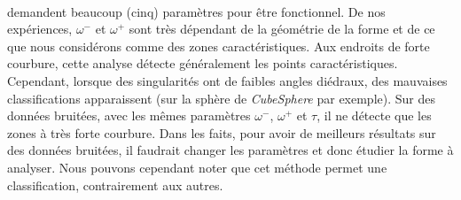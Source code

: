 \paragraph{}
%
 demandent beaucoup (cinq) paramètres pour être fonctionnel. De
nos expériences, $\omega^-$ et $\omega^+$ sont très dépendant de la géométrie de
la forme et de ce que nous considérons comme des zones caractéristiques. Aux
endroits de forte courbure, cette analyse détecte généralement les points
caractéristiques. Cependant, lorsque des singularités ont de faibles angles
diédraux, des mauvaises classifications apparaissent (sur la sphère de
\emph{CubeSphere} par exemple). Sur des données bruitées, avec les mêmes
paramètres $\omega^-$, $\omega^+$ et $\tau$, il ne détecte que les zones à très
forte courbure. Dans les faits, pour avoir de meilleurs résultats sur des
données bruitées, il faudrait changer les paramètres et donc étudier la forme à
analyser. Nous pouvons cependant noter que cet méthode permet une
classification, contrairement aux autres.
%
